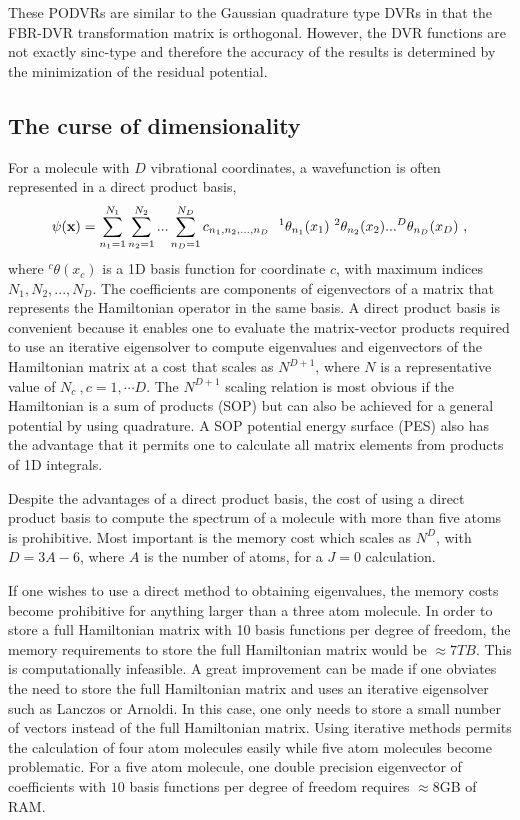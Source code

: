 {These PODVRs are similar to the Gaussian quadrature type DVRs in that the FBR-DVR transformation matrix is orthogonal.  However, the DVR functions are not exactly sinc-type and therefore the accuracy of the results is determined by the minimization of the residual potential.


\subsection{The curse of dimensionality}
 For a molecule with $D$ vibrational coordinates,  a 
wavefunction is often represented in a  direct product basis,
\begin{equation}\label{Eq.bdp}
\psi({\bf{x)}} = \sum_{n_1=1}^{N_1}\sum_{n_2=1}^{N_2}...\sum_{n_D=1}^{N_D}  c_{n_1,n_2,...,n_D} ~~  ^1\theta_{n_1}(x_1)~  ^2\theta_{n_2}(x_2)...^D\theta_{n_D}(x_D) ~,
\end{equation}
%
where $^c\theta(x_c )$ is a 1D basis function for coordinate $c$,
  with maximum  indices $N_1,N_2,...,N_D$.  
The coefficients are components of eigenvectors of a matrix that represents the Hamiltonian operator in the same basis.  
A direct product basis is convenient because it enables one to  evaluate  the matrix-vector products required to use an 
iterative eigensolver to compute eigenvalues and eigenvectors of the Hamiltonian matrix at a cost that scales as $N^{D+1}$, where $N$ is a representative value of $N_c~,c=1, \cdots D$.\cite{Light2000,Manthe1990,Bramley1993,Bramley1994} 
 The   $N^{D+1}$ scaling relation is most obvious if the Hamiltonian is a sum of products (SOP) but can also be achieved for a general potential by using quadrature.\cite{Light2000} 
%
  A SOP potential energy surface
(PES) also has the advantage that it 
permits one to calculate all matrix elements from  products of 1D integrals.\cite{Jelski1996}  




Despite the  advantages of a direct product basis, the cost of using  a direct product basis to compute     the   spectrum  of   a molecule with more than five atoms is  prohibitive.
Most important is the memory cost which scales as  $N^D$, with $D=3A-6$,  where $A$ is the number 
of atoms, for a $J=0$ calculation.  


If one wishes to use a direct method to obtaining eigenvalues, the memory costs become prohibitive for anything larger than a three atom molecule.  In order to store a full Hamiltonian matrix with 10 basis functions per degree of freedom, the memory requirements to store the full Hamiltonian matrix would be $\approx 7 TB$. This is computationally infeasible. A great improvement can be made if one obviates the need to store the full Hamiltonian matrix and uses an iterative eigensolver such as Lanczos\cite{Lanczos1950} or Arnoldi\cite{Lehoucq1998b}.  In this case, one only needs to store a small number of vectors instead of the full Hamiltonian matrix. Using iterative methods permits the calculation of four atom molecules easily while five atom molecules become problematic. 
For a five atom molecule, one double precision eigenvector of coefficients with $10$ basis functions per degree of freedom requires $\approx 8$GB of RAM. 


}
